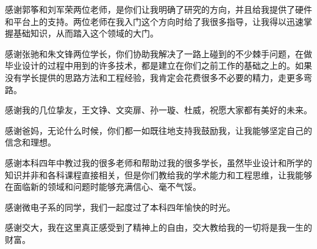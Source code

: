 \begin{thanks}

感谢郭筝和刘军荣两位老师，是你们让我明确了研究的方向，并且给我提供了硬件和平台上的支持。两位老师在我入门这个方向时给了我很多指导，让我得以迅速掌握基础知识，从而踏入这个领域的大门。

感谢张驰和朱文锋两位学长，你们协助我解决了一路上碰到的不少棘手问题，在做毕业设计的过程中用到的许多技术，都是建立在你们之前工作的基础之上的。如果没有学长提供的思路方法和工程经验，我肯定会花费很多不必要的精力，走更多弯路。

感谢我的几位挚友，王文铮、文奕扉、孙一璇、杜威，祝愿大家都有美好的未来。

感谢爸妈，无论什么时候，你们都一如既往地支持我鼓励我，让我能够坚定自己的信念和理想。

感谢本科四年中教过我的很多老师和帮助过我的很多学长，虽然毕业设计和所学的知识并非和各科课程直接相关，但是你们教给我的学术能力和工程思维，让我能够在面临新的领域和问题时能够充满信心、毫不气馁。

感谢微电子系的同学，我们一起度过了本科四年愉快的时光。

感谢交大，我在这里真正感受到了精神上的自由，交大教给我的一切将是我一生的财富。


\end{thanks}
